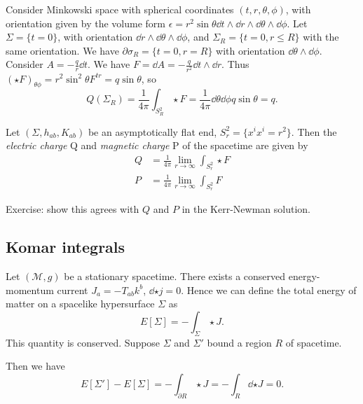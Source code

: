 \documentclass{jknotes}
\begin{document}
\begin{eg}
    Consider Minkowski space with spherical coordinates \((t,r,\theta,\phi)\), with orientation given by the volume form \(\epsilon = r^2\sin\theta \dd{t}\wedge\dd{r}\wedge\dd{\theta}\wedge\dd{\phi}\). Let \(\Sigma=\{t=0\}\), with orientation \(\dd{r}\wedge\dd{\theta}\wedge\dd{\phi}\), and \(\Sigma_R = \{t=0,r\le R\}\) with the same orientation. We have \(\partial \sigma_R = \{t=0,r=R\}\) with orientation \(\dd{\theta}\wedge\dd{\phi}\). Consider \(A=-\frac{q}{r}\dd{t}\). We have \(F=\dd{A} = -\frac{q}{r^2}\dd{t}\wedge\dd{r}\). Thus \((\star F)_{\theta\phi} = r^2\sin^2\theta F^{tr} = q\sin\theta\), so
    \begin{equation}
        Q(\Sigma_R) = \frac{1}{4\pi}\int_{S^2_R}\star F = \frac{1}{4\pi}\dd{\theta}\dd{\phi} q\sin\theta = q.
    \end{equation}
\end{eg}

\begin{defn}
    Let \((\Sigma, h_{ab}, K_{ab})\) be an asymptotically flat end, \(S_r^2 = \{x^ix^i=r^2\}\). Then the \emph{electric charge} Q and \emph{magnetic charge} P of the spacetime are given by
    \begin{align}
        Q &= \frac{1}{4\pi} \lim_{r\to\infty} \int_{S_r^2} \star F \\
        P &= \frac{1}{4\pi} \lim_{r\to\infty} \int_{S_r^2} F
    \end{align}
\end{defn}
Exercise: show this agrees with \(Q\) and \(P\) in the Kerr-Newman solution.

\subsection{Komar integrals}
Let \((\mathcal{M},g)\) be a stationary spacetime. There exists a conserved energy-momentum current \(J_a = -T_{ab}k^b\), \(\dd{\star j} = 0\). Hence we can define the total energy of matter on a spacelike hypersurface \(\Sigma\) as
\begin{equation}
    E[\Sigma] = -\int_\Sigma \star J.
\end{equation}
This quantity is conserved. Suppose \(\Sigma\) and \(\Sigma'\) bound a region \(R\) of spacetime.
\begin{figure}[H]
    \centering
\end{figure}
Then we have
\begin{equation}
    E[\Sigma']-E[\Sigma] = - \int_{\partial R} \star J = -\int_R \dd{\star J} = 0.
\end{equation}
\end{document}
